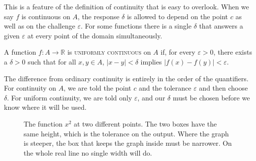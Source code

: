This is a feature of the definition of continuity that is easy to overlook.  When we say $f$ is continuous on $A$, the response $\delta$ is allowed to depend on the point $c$ as well as on the challenge $\varepsilon$.  For some functions there is a single $\delta$ that answers a given $\varepsilon$ at every point of the domain simultaneously.

\begin{definition}\label{def:uniform-continuity}
A function $f : A \to \mathbb{R}$ is \textsc{uniformly continuous} on $A$ if, for every $\varepsilon > 0$, there exists a $\delta > 0$ such that for all $x, y \in A$, $|x - y| < \delta$ implies $|f(x) - f(y)| < \varepsilon$.
\end{definition}

The difference from ordinary continuity is entirely in the order of the quantifiers.  For continuity on $A$, we are told the point $c$ and the tolerance $\varepsilon$ and then choose $\delta$.  For uniform continuity, we are told only $\varepsilon$, and our $\delta$ must be chosen before we know where it will be used.

\begin{figure}
\centering
{}
\caption{The function $x^2$ at two different points.  The two boxes have the same height, which is the tolerance on the output.  Where the graph is steeper, the box that keeps the graph inside must be narrower.  On the whole real line no single width will do.}
\label{fig:uniform}
\end{figure}

